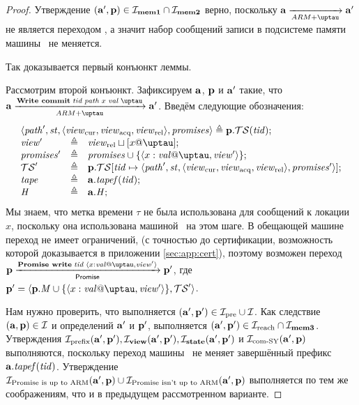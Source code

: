 \begin{proof}
  Утверждение $(\mathbf{a}', \mathbf{p}) \in \mathcal{I}_{\rm \bf mem1} \cap \mathcal{I}_{\rm \bf mem2}$ верно, поскольку $\aT \armStepgen{} \aT'$ не
  является переходом , а значит набор сообщений записи в подсистеме памяти машины \ARMt~не меняется.
  
  Так доказывается первый конъюнкт леммы.
  
  Рассмотрим второй конъюнкт.
  Зафиксируем $\mathbf{a}$, $\mathbf{p}$ и $\mathbf{a}'$ такие, что $\aT \armStepWriteCommit \aT'$.
  Введём следующие обозначения:
\[
\begin{array}{l l l}
\multicolumn{3}{l}{\angled{\cpath', \PromState, \angled{\Rcur, \Racq, \Rrel}, \PromSet} \triangleq \p.\TSfprom(\tId);}\\
\R' & \triangleq & \Rrel \sqcup [x @ \tau]; \\
\PromSet' & \triangleq & \PromSet \cup \{\writeEvt{x}{\stval}{\tau}{\R'}\}; \\
\TSfprom' & \triangleq & \p.\TSfprom[\tId \mapsto \angled{\cpath', \PromState, \angled{\Rcur, \Racq, \Rrel}, \PromSet'}]; \\
\tape     & \triangleq & \aT.\tapef(\tId); \\
\hmap     & \triangleq & \aT.\hmap; \\
\end{array}
\]
Мы знаем, что метка времени $\tau$ не была использована для сообщений к локации $x$,
поскольку она использована машиной \ARMt~на этом шаге.
В обещающей машине переход  не имеет ограничений,
(с точностью до сертификации, возможность которой доказывается в приложении \ref{sec:app:cert}),
поэтому возможен переход $\p \promStepPromiseRPrime \p'$,
где $\p' = \angled{\p.\Mprom \cup \{\writeEvt{x}{\stval}{\tau}{\R'}\}, \TSfprom'}$.

Нам нужно проверить, что выполняется $(\mathbf{a}', \mathbf{p}') \in \mathcal{I}_{\textup{\rm pre}} \cup \mathcal{I}$.
Как следствие $(\mathbf{a}, \mathbf{p}) \in \mathcal{I}$ и определений $\mathbf{a}'$ и $\mathbf{p}'$, выполняется $(\mathbf{a}', \mathbf{p}') \in \mathcal{I}_{\textup{\rm reach}} \cap \mathcal{I}_{\rm \bf mem3}$.
Утверждения $\mathcal{I}_{\textup{\rm prefix}}(\mathbf{a}', \mathbf{p}'), \mathcal{I}_{\rm \bf view}(\mathbf{a}', \mathbf{p}'), \mathcal{I}_{\rm \bf state}(\mathbf{a}', \mathbf{p}')$ и $\mathcal{I}_{\textup{\rm com-SY}}(\mathbf{a}', \mathbf{p})$ выполняются,
поскольку переход  машины \ARMt~не меняет завершённый префикс $\mathbf{a}.\mathit{tapef}(\mathit{tid})$.
Утверждение $\mathcal{I}_{\textup{\rm Promise is up to ARM}}(\mathbf{a}', \mathbf{p}) \cup \mathcal{I}_{\textup{\rm Promise isn't up to ARM}}(\mathbf{a}', \mathbf{p})$ выполняется по тем же соображениям, что
и в предыдущем рассмотренном варианте.


\end{proof}
